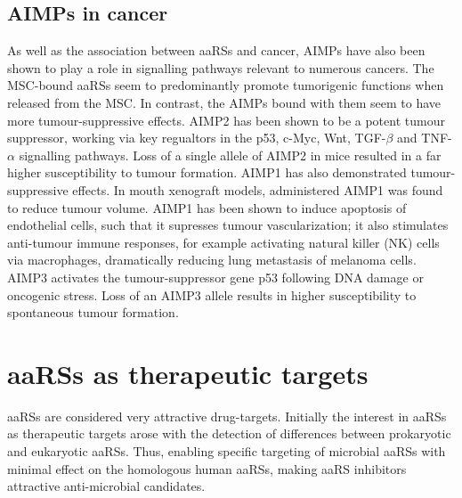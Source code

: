 \subsection{AIMPs in cancer}
As well as the association between aaRSs and cancer, AIMPs have also been shown to play a role in signalling pathways relevant to numerous cancers.
The MSC-bound aaRSs seem to predominantly promote tumorigenic functions when released from the MSC.
In contrast, the AIMPs bound with them seem to have more tumour-suppressive effects.
AIMP2 has been shown to be a potent tumour suppressor, working via key regualtors in the p53, c-Myc, Wnt, TGF-$\beta$ and TNF-$\alpha$ signalling pathways.
Loss of a single allele of AIMP2 in mice resulted in a far higher susceptibility to tumour formation\cite{choi2009multidirectional}.
AIMP1 has also demonstrated tumour-suppressive effects.
In mouth xenograft models, administered AIMP1 was found to reduce tumour volume\cite{han2010antitumor, lee2006antitumor}.
AIMP1 has been shown to induce apoptosis of endothelial cells, such that it supresses tumour vascularization\cite{park2002dose}; it also stimulates anti-tumour immune responses, for example activating natural killer (NK) cells via macrophages, dramatically reducing lung metastasis of melanoma cells\cite{kim2017aminoacyl}.
AIMP3 activates the tumour-suppressor gene p53 following DNA damage or oncogenic stress.
Loss of an AIMP3 allele results in higher susceptibility to spontaneous tumour formation\cite{park2005haploinsufficient}.


\section{aaRSs as therapeutic targets}
aaRSs are considered very attractive drug-targets.
Initially the interest in aaRSs as therapeutic targets arose with the detection of differences between prokaryotic and eukaryotic aaRSs.
Thus, enabling specific targeting of microbial aaRSs with minimal effect on the homologous human aaRSs, making aaRS inhibitors attractive anti-microbial candidates.

